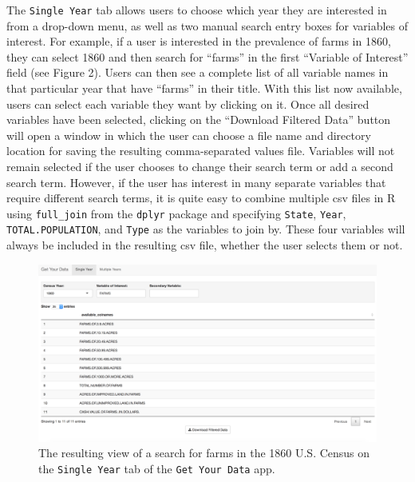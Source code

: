 \documentclass[11pt,]{article}
\begin{document}
The \texttt{Single\ Year} tab allows users to choose which year they are
interested in from a drop-down menu, as well as two manual search entry
boxes for variables of interest. For example, if a user is interested in
the prevalence of farms in 1860, they can select 1860 and then search
for ``farms'' in the first ``Variable of Interest'' field (see Figure
2). Users can then see a complete list of all variable names in that
particular year that have ``farms'' in their title. With this list now
available, users can select each variable they want by clicking on it.
Once all desired variables have been selected, clicking on the
``Download Filtered Data'' button will open a window in which the user
can choose a file name and directory location for saving the resulting
comma-separated values file. Variables will not remain selected if the
user chooses to change their search term or add a second search term.
However, if the user has interest in many separate variables that
require different search terms, it is quite easy to combine multiple csv
files in R using \texttt{full\_join} from the \texttt{dplyr} package and
specifying \texttt{State}, \texttt{Year}, \texttt{TOTAL.POPULATION}, and
\texttt{Type} as the variables to join by. These four variables will
always be included in the resulting csv file, whether the user selects
them or not.

\begin{figure}[htbp]
\centering
\includegraphics{./figures/app-sshot-farms.png}
\caption{The resulting view of a search for farms in the 1860 U.S.
Census on the \texttt{Single\ Year} tab of the \texttt{Get\ Your\ Data}
app.}
\end{figure}
\end{document}
